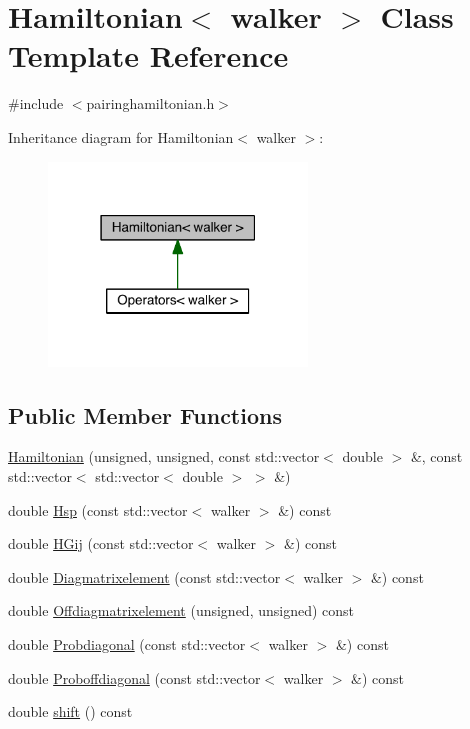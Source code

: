 \hypertarget{class_hamiltonian}{\section{Hamiltonian$<$ walker $>$ Class Template Reference}
\label{class_hamiltonian}
}


{\ttfamily \#include $<$pairinghamiltonian.\+h$>$}



Inheritance diagram for Hamiltonian$<$ walker $>$\+:
\nopagebreak
\begin{figure}[H]
\begin{center}
\leavevmode
\includegraphics[width=195pt]{class_hamiltonian__inherit__graph}
\end{center}
\end{figure}
\subsection*{Public Member Functions}
\begin{DoxyCompactItemize}
\item 
\hyperlink{class_hamiltonian_a46352920e7b3584bc39c090d61d81da0}{Hamiltonian} (unsigned, unsigned, const std\+::vector$<$ double $>$ \&, const std\+::vector$<$ std\+::vector$<$ double $>$ $>$ \&)
\item 
double \hyperlink{class_hamiltonian_abd13e961c8b87b3f29a4df3781f7564e}{Hsp} (const std\+::vector$<$ walker $>$ \&) const 
\item 
double \hyperlink{class_hamiltonian_a3505c8e69ce74694dde7c4a523ca7b28}{H\+Gij} (const std\+::vector$<$ walker $>$ \&) const 
\item 
double \hyperlink{class_hamiltonian_a01979613275eed5b5c72c85a01be263a}{Diagmatrixelement} (const std\+::vector$<$ walker $>$ \&) const 
\item 
double \hyperlink{class_hamiltonian_a36a5a68b3c77370a5a4130be3393c007}{Offdiagmatrixelement} (unsigned, unsigned) const 
\item 
double \hyperlink{class_hamiltonian_ae1e4d1a832d6ce46c67a090dfe15e0b5}{Probdiagonal} (const std\+::vector$<$ walker $>$ \&) const 
\item 
double \hyperlink{class_hamiltonian_a665d48115a9a9a868328bce1537e6641}{Proboffdiagonal} (const std\+::vector$<$ walker $>$ \&) const 
\item 
double \hyperlink{class_hamiltonian_a73563fb395a29fb15daf88aaa46748e3}{shift} () const 
\end{DoxyCompactItemize}
